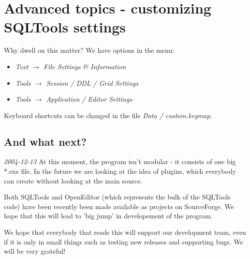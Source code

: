 \documentclass[a4paper,titlepage]{article}
\begin{document}
\section{Advanced topics - customizing SQLTools settings}
Why dwell on this matter? We have options in the menu:
\begin{itemize}
\item \emph{Text $\to$ File Settings \& Information}
\item \emph{Tools $\to$ Session / DDL / Grid Settings}
\item \emph{Tools $\to$ Application / Editor Settings}
\end{itemize}
Keyboard shortcuts can be changed in the file \emph{Data / custom.keymap}.

\subsection{And what next?}
\emph{2004-12-13}
At this moment, the program isn't modular - it consists of one big *.exe file. In the future we are looking at the idea of plugins, which everybody can create without looking at the main source.

Both SQLTools and OpenEditor (which represents the bulk of the SQLTools code) have been recently been made available as projects on SourceForge. We hope that this will lead to 'big jump' in developement of the program.

We hope that everybody that reads this will support our development team, even if it is only in small things such as testing new releases and supporting bugs. We will be very grateful!
\end{document}
